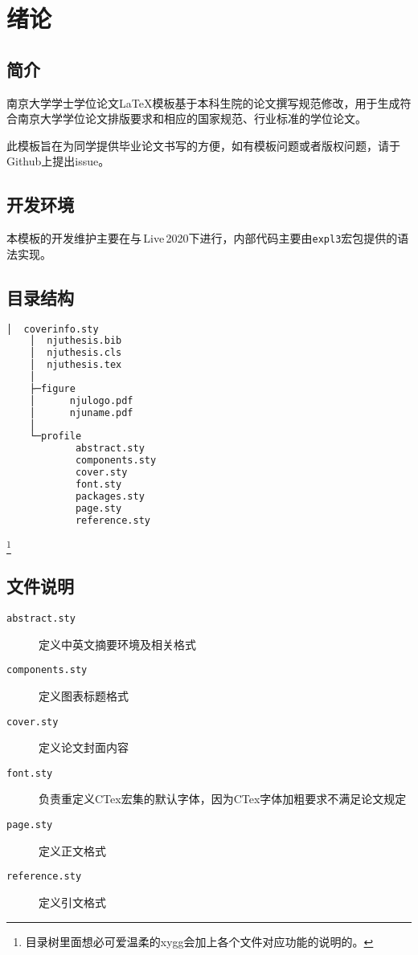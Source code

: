 \chapter{绪论}

\section{简介}
南京大学学士学位论文\LaTeX 模板\cite{njuthesis}基于本科生院的论文撰写规范修改，用于生成符合南京大学学位论文排版要求和相应的国家规范、行业标准的学位论文。

此模板旨在为同学提供毕业论文书写的方便，如有模板问题或者版权问题，请于Github上提出issue。

\section{开发环境}

本模板的开发维护主要在与\,Live\,2020下进行，内部代码主要由\lstinline|expl3|宏包提供的语法实现。

\section{目录结构}
\label{sec:directory}

\begin{lstlisting}[language=bash]
    │  coverinfo.sty
    │  njuthesis.bib
    │  njuthesis.cls
    │  njuthesis.tex
    │
    ├─figure
    │      njulogo.pdf
    │      njuname.pdf
    │
    └─profile
            abstract.sty
            components.sty
            cover.sty
            font.sty
            packages.sty
            page.sty
            reference.sty
\end{lstlisting}

\footnote{目录树里面想必可爱温柔的xygg会加上各个文件对应功能的说明的。}

\section{文件说明}
\begin{description}
    \item [\texttt{abstract.sty}] 定义中英文摘要环境及相关格式
    \item [\texttt{components.sty}] 定义图表标题格式
    \item [\texttt{cover.sty}] 定义论文封面内容
    \item [\texttt{font.sty}] 负责重定义CTex宏集的默认字体，因为CTex字体加粗要求不满足论文规定
    \item [\texttt{page.sty}] 定义正文格式
    \item [\texttt{reference.sty}] 定义引文格式
\end{description}

